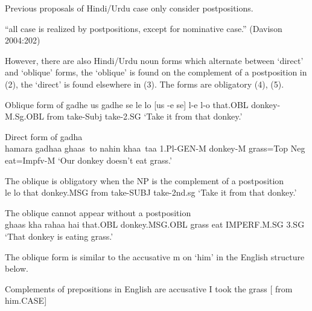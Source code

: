 \documentclass{article}
\let\ipa\textipa %
\begin{document}
Previous proposals of Hindi/Urdu case only consider postpositions.

\begin{example}
``all case is realized by postpositions, except for nominative case.” (Davison 2004:202)
\end{example}

However, there are also Hindi/Urdu noun forms which alternate between `direct' and `oblique' forms, the `oblique' is found on the complement of a postposition in (2), the `direct' is found elsewhere in (3). The forms are obligatory (4), (5).

\begin{example}Oblique form of gadhe
\glll us gadhe se le lo
[us \ipa{g@d\textsuperscript{H}}-e se] l-e l-o
that.OBL donkey-M.Sg.OBL from take-Subj take-2.SG
\glt `Take it from that donkey.'
\glend
\end{example}

\begin{example}Direct form of gadha\\
\gll hamara gadhaa ghaas~to nahin khaa~taa
1.Pl-GEN-M donkey-M grass=Top Neg eat=Impfv-M
\glt `Our donkey doesn't eat grass.'
\glend
\end{example}

\begin{example}The oblique is obligatory when the NP is the complement of a postposition\\
\gll [*wo   gadha   se]  le lo
that  donkey.MSG  from  take-SUBJ take-2nd.sg
\glt`Take it from that donkey.'
\glend
\end{example}

\begin{example}The oblique cannot appear without a postposition\\
\gll [*us   gadhe]   ghaas  kha rahaa   hai
that.OBL  donkey.MSG.OBL  grass eat IMPERF.M.SG 3.SG
\glt`That donkey is eating grass.'
\glend
\end{example}

The oblique form is similar to the accusative m on `him' in the English structure below.

\begin{example}Complements of prepositions in English are accusative
 I took the grass [ from him.CASE] \\
\end{example}
\end{document}

